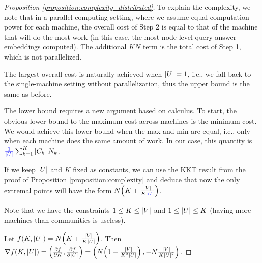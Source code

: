 \begin{proof}[Proposition \ref{proposition:complexity_distributed}]
    To explain the complexity, we note that in a parallel computing setting, where we assume equal computation power for each machine, the overall cost of Step 2 is equal to that of the machine that will do the most work (in this case, the most node-level query-answer embeddings computed). The additional $KN$ term is the total cost of Step 1, which is not parallelized.

    The largest overall cost is naturally achieved when $\mathopen{}\left|U\right|=1$, i.e., we fall back to the single-machine setting without parallelization, thus the upper bound is the same as before.

    The lower bound requires a new argument based on calculus. To start, the obvious lower bound to the maximum cost across machines is the minimum cost. We would achieve this lower bound when the max and min are equal, i.e., only when each machine does the same amount of work. In our case, this quantity is $\textcolor{blue}{\frac{1}{\mathopen{}\left|U\right|}}\sum_{k=1}^{K}{\mathopen{}\left|C_k\right|N_k}$. 
    
    If we keep $\mathopen{}\left|U\right|$ and $K$ fixed as constants, we can use the KKT result from the proof of Proposition \ref{proposition:complexity} and deduce that now the only extremal points will have the form $N\mathopen{}\left(K+\frac{\mathopen{}\left|V\right|}{K\textcolor{blue}{\mathopen{}\left|U\right|}}\right)$. 
    
    Note that we have the constraints $1 \leq K \leq \mathopen{}\left|V\right|$ and $1 \leq \mathopen{}\left|U\right| \leq K$ (having more machines than communities is useless).

    Let $f\mathopen{}\left(K, \mathopen{}\left|U\right|\right)=N\mathopen{}\left(K+\frac{\mathopen{}\left|V\right|}{K\mathopen{}\left|U\right|}\right)$. Then $\nabla f \mathopen{}\left(K, \mathopen{}\left|U\right|\right)=\mathopen{}\left(\frac{\partial f}{\partial K},\frac{\partial f}{\partial \mathopen{}\left|U\right|}\right)=\mathopen{}\left(N\mathopen{}\left(1-\frac{\mathopen{}\left|V\right|}{K^2\mathopen{}\left|U\right|}\right), -N\frac{\mathopen{}\left|V\right|}{K\mathopen{}\left|U\right|^2}\right)$.


\end{proof}
